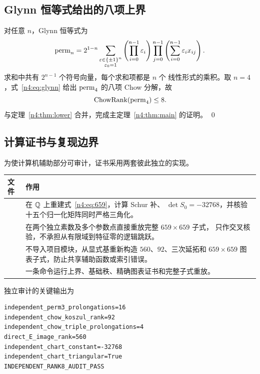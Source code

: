 \subsection{Glynn 恒等式给出的八项上界}\label{n4:sec:upper}

对任意 \(n\)，Glynn 恒等式为
\begin{equation}\label{n4:eq:glynn}
  \operatorname{perm}_n
  =2^{1-n}
  \sum_{\substack{\varepsilon\in\{\pm1\}^n\\\varepsilon_0=1}}
  \left(\prod_{i=0}^{n-1}\varepsilon_i\right)
  \prod_{j=0}^{n-1}
  \left(\sum_{i=0}^{n-1}\varepsilon_i x_{ij}\right).
\end{equation}
求和中共有 \(2^{n-1}\) 个符号向量，每个求和项都是 \(n\) 个
线性形式的乘积。取 \(n=4\)，式~\eqref{n4:eq:glynn} 给出
\(\operatorname{perm}_4\) 的八项 Chow 分解，故
\[
  \operatorname{ChowRank}(\operatorname{perm}_4)\leq8.
\]
与定理~\ref{n4:thm:lower} 合并，完成主定理~\ref{n4:thm:main} 的证明。
\qed

\subsection{计算证书与复现边界}\label{n4:sec:certificate}

为使计算机辅助部分可审计，证书采用两套彼此独立的实现。
\begingroup
\small

\begin{center}
\begin{tabularx}{0.94\textwidth}{@{}>{\hsize}L>{\hsize}L@{}}
\toprule
文件 & 作用\\
\midrule
{}
& 在 \(\mathbb Q\) 上重建式~\eqref{n4:eq:659}，计算 Schur 补、
\(\det S_0=-32768\)，并核验十五个归一化矩阵同时严格三角化。\\
& 在两个独立素数及多个参数点直接重放完整 \(659\times659\) 子式，
只作交叉核验，不承担从有限域到特征零的逻辑跳跃。\\
& 不导入项目模块，从显式基重新构造 \(560\)、\(92\)、三次延拓和
\(659\times659\) 图表子式，防止共享辅助函数或索引错误。\\
& 一条命令运行上界、基础秩、精确图表证书和完整子式重放。\\
\bottomrule
\end{tabularx}
\end{center}

独立审计的关键输出为
\begin{verbatim}
independent_perm3_prolongations=16
independent_chow_koszul_rank=92
independent_chow_triple_prolongations=4
direct_E_image_rank=560
independent_chart_constant=-32768
independent_chart_triangular=True
INDEPENDENT_RANK8_AUDIT_PASS
\end{verbatim}

